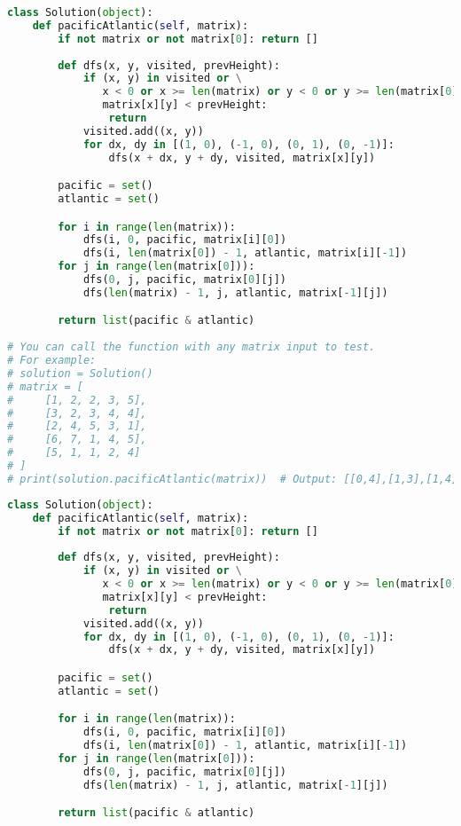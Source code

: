 \begin{fullwidth}
\begin{lstlisting}[language=Python]
class Solution(object):
    def pacificAtlantic(self, matrix):
        if not matrix or not matrix[0]: return []
        
        def dfs(x, y, visited, prevHeight):
            if (x, y) in visited or \
               x < 0 or x >= len(matrix) or y < 0 or y >= len(matrix[0]) or \
               matrix[x][y] < prevHeight:
                return
            visited.add((x, y))
            for dx, dy in [(1, 0), (-1, 0), (0, 1), (0, -1)]:
                dfs(x + dx, y + dy, visited, matrix[x][y])

        pacific = set()
        atlantic = set()

        for i in range(len(matrix)):
            dfs(i, 0, pacific, matrix[i][0])
            dfs(i, len(matrix[0]) - 1, atlantic, matrix[i][-1])
        for j in range(len(matrix[0])):
            dfs(0, j, pacific, matrix[0][j])
            dfs(len(matrix) - 1, j, atlantic, matrix[-1][j])

        return list(pacific & atlantic)
        
# You can call the function with any matrix input to test.
# For example:
# solution = Solution()
# matrix = [
#     [1, 2, 2, 3, 5],
#     [3, 2, 3, 4, 4],
#     [2, 4, 5, 3, 1],
#     [6, 7, 1, 4, 5],
#     [5, 1, 1, 2, 4]
# ]
# print(solution.pacificAtlantic(matrix))  # Output: [[0,4],[1,3],[1,4],[2,2],[3,0],[3,1],[4,0]]
\end{lstlisting}
\end{fullwidth}

\begin{fullwidth}
\begin{lstlisting}[language=Python]
class Solution(object):
    def pacificAtlantic(self, matrix):
        if not matrix or not matrix[0]: return []
        
        def dfs(x, y, visited, prevHeight):
            if (x, y) in visited or \
               x < 0 or x >= len(matrix) or y < 0 or y >= len(matrix[0]) or \
               matrix[x][y] < prevHeight:
                return
            visited.add((x, y))
            for dx, dy in [(1, 0), (-1, 0), (0, 1), (0, -1)]:
                dfs(x + dx, y + dy, visited, matrix[x][y])

        pacific = set()
        atlantic = set()

        for i in range(len(matrix)):
            dfs(i, 0, pacific, matrix[i][0])
            dfs(i, len(matrix[0]) - 1, atlantic, matrix[i][-1])
        for j in range(len(matrix[0])):
            dfs(0, j, pacific, matrix[0][j])
            dfs(len(matrix) - 1, j, atlantic, matrix[-1][j])

        return list(pacific & atlantic)
\end{lstlisting}
\end{fullwidth}

